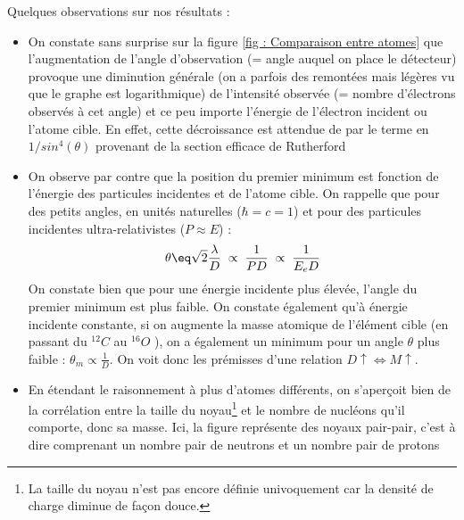 Quelques observations sur nos résultats :
\begin{itemize}[label=$\bullet$]
    \item On constate sans surprise sur la figure \eqref{fig : Comparaison entre atomes} que l'augmentation de l'angle d'observation (= angle auquel on place le détecteur) provoque une diminution générale (on a parfois des remontées mais légères vu que le graphe est logarithmique) de l'intensité observée (= nombre d'électrons observés à cet angle) et ce peu importe l'énergie de l'électron incident ou l'atome cible. En effet, cette décroissance est attendue de par le terme en  $1/sin^4(\theta)$ provenant de la section efficace de Rutherford

    \item On observe par contre que la position du premier minimum est fonction de l'énergie des particules incidentes et de l'atome cible. On rappelle que pour des petits angles, en unités naturelles ($\hbar = c = 1$) et pour des particules incidentes ultra-relativistes ($P \approx E$) :
    \begin{equation*}
        \theta \eq \sqrt{2} \frac{\lambda}{D} \; \propto \; \frac{1}{P D} \; \propto \; \frac{1}{E_e D}
    \end{equation*}
    On constate bien que pour une énergie incidente plus élevée, l'angle du premier minimum est plus faible. On constate également qu'à énergie incidente constante, si on augmente la masse atomique de l'élément cible (en passant du $^{12}C$ au $^{16}O$ ), on a également un minimum pour un angle $\theta$ plus faible : $\theta_m \propto \frac{1}{D}$. On voit donc les prémisses d'une relation $D\uparrow \Leftrightarrow M\uparrow$.\\
    \item En étendant le raisonnement à plus d'atomes différents, on s'aperçoit bien de la corrélation entre la taille du noyau\footnote{La taille du noyau n'est pas encore définie univoquement car la densité de charge diminue de façon douce.} et le nombre de nucléons qu'il comporte, donc sa masse. Ici, la figure représente des noyaux pair-pair, c'est à dire comprenant un nombre pair de neutrons et un nombre pair de protons
     \begin{figure}[H]
        \centering

\end{figure}
\end{itemize}
